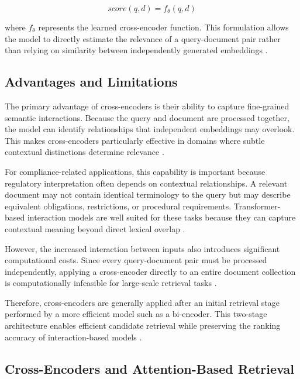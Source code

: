 \begin{equation}
score(q,d)=f_{\theta}(q,d)
\end{equation}

where $f_{\theta}$ represents the learned cross-encoder function. This formulation allows the model to directly estimate the relevance of a query-document pair rather than relying on similarity between independently generated embeddings \cite{nogueira2019passage}.

\subsection{Advantages and Limitations}

The primary advantage of cross-encoders is their ability to capture fine-grained semantic interactions. Because the query and document are processed together, the model can identify relationships that independent embeddings may overlook. This makes cross-encoders particularly effective in domains where subtle contextual distinctions determine relevance \cite{nogueira2019passage}.

For compliance-related applications, this capability is important because regulatory interpretation often depends on contextual relationships. A relevant document may not contain identical terminology to the query but may describe equivalent obligations, restrictions, or procedural requirements. Transformer-based interaction models are well suited for these tasks because they can capture contextual meaning beyond direct lexical overlap \cite{devlin2019bert}.

However, the increased interaction between inputs also introduces significant computational costs. Since every query-document pair must be processed independently, applying a cross-encoder directly to an entire document collection is computationally infeasible for large-scale retrieval tasks \cite{nogueira2019passage}.

Therefore, cross-encoders are generally applied after an initial retrieval stage performed by a more efficient model such as a bi-encoder. This two-stage architecture enables efficient candidate retrieval while preserving the ranking accuracy of interaction-based models \cite{karpukhin2020dense}.

\subsection{Cross-Encoders and Attention-Based Retrieval}

